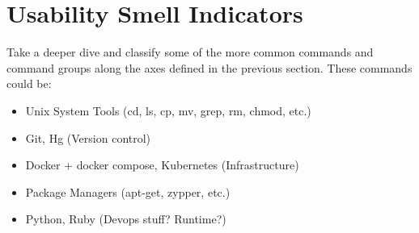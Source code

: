 \section{Usability Smell Indicators}

Take a deeper dive and classify some of the more common commands and command groups along the axes defined in the previous section. These commands could be:
\begin{itemize}
	\item Unix System Tools (cd, ls, cp, mv, grep, rm, chmod, etc.)
	\item Git, Hg (Version control)
	\item Docker + docker compose, Kubernetes (Infrastructure)
	\item Package Managers (apt-get, zypper, etc.)
	\item Python, Ruby (Devops stuff? Runtime?)
\end{itemize}


\newcommand{\rot}[1]{\makebox[1em][l]{\rotatebox{45}{#1}}}

\newcommand{\yes}{$\CIRCLE$}
\newcommand{\no}{}
\newcommand{\some}{$\Circle$}
\newcommand{\many}{$\LEFTcircle$}

